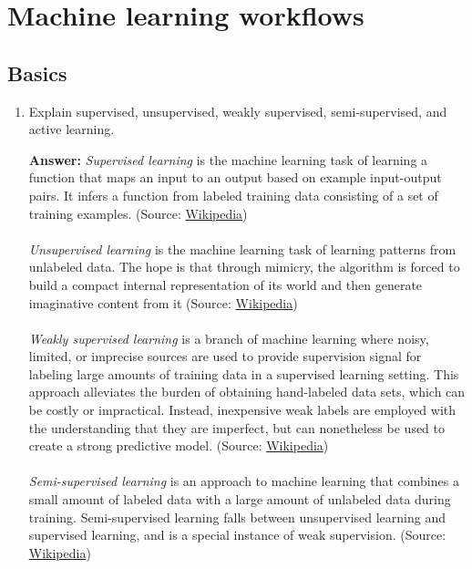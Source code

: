 \documentclass{article}
\newenvironment{QandA}{\begin{enumerate}[label=\arabic*.]}{\end{enumerate}}
\newenvironment{answer}{\par\normalfont \textbf{Answer:}}{}
\begin{document}
\section{Machine learning workflows}
\subsection{Basics}
\begin{QandA}
    \item Explain supervised, unsupervised, weakly supervised, semi-supervised, and active learning.
    \begin{answer}
        \textit{Supervised learning} is the machine learning task of learning a function that maps an input to an output based on example input-output pairs. It infers a function from labeled training data consisting of a set of training examples. (Source: \href{https://en.wikipedia.org/wiki/Supervised_learning}{Wikipedia}) \\\\
        \textit{Unsupervised learning} is the machine learning task of learning patterns from unlabeled data. The hope is that through mimicry, the algorithm is forced to build a compact internal representation of its world and then generate imaginative content from it (Source: \href{https://en.wikipedia.org/wiki/Unsupervised_learning}{Wikipedia}) \\\\
        \textit{Weakly supervised learning} is a branch of machine learning where noisy, limited, or imprecise sources are used to provide supervision signal for labeling large amounts of training data in a supervised learning setting. This approach alleviates the burden of obtaining hand-labeled data sets, which can be costly or impractical. Instead, inexpensive weak labels are employed with the understanding that they are imperfect, but can nonetheless be used to create a strong predictive model. (Source: \href{https://en.wikipedia.org/wiki/Weak_supervision}{Wikipedia}) \\\\
        \textit{Semi-supervised learning} is an approach to machine learning that combines a small amount of labeled data with a large amount of unlabeled data during training. Semi-supervised learning falls between unsupervised learning and supervised learning, and is a special instance of weak supervision. (Source: \href{https://en.wikipedia.org/wiki/Semi-supervised_learning}{Wikipedia}) \\\\

\end{answer}
\end{QandA}
\end{document}

